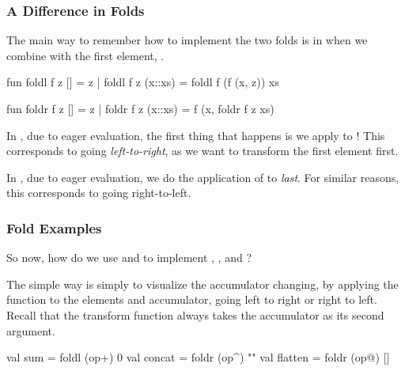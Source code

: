 \documentclass[aspectratio=169, handout]{beamer}
\begin{document}
\begin{frame}[fragile]
  \frametitle{A Difference in Folds}

  The main way to remember how to implement the two folds is in when we 
  combine with the first element, .

  \pause
  \vspace{\fill}

  \begin{codeblock}
    fun foldl f z [] = z
      | foldl f z (x::xs) = foldl f (f (x, z)) xs  

    fun foldr f z [] = z
      | foldr f z (x::xs) = f (x, foldr f z xs)
  \end{codeblock}

  \pause
  \vspace{\fill}

  In , due to eager evaluation, the first thing that happens is we
  apply  to ! This corresponds to going \textit{left-to-right},
  as we want to transform the first element first.

  \pause
  \vspace{\fill}

  In , due to eager evaluation, we do the application of 
  to  \textit{last}. For similar reasons, this corresponds to going
  right-to-left.
\end{frame}

\begin{frame}[fragile]
  \frametitle{Fold Examples}

  So now, how do we use  and  to implement
  , , and ?

  \pause
  \vspace{\fill}
  
  The simple way is simply to visualize the accumulator changing, by 
  applying the function to the elements and accumulator, going left to
  right or right to left. Recall that the transform function 
  always takes the accumulator as its second argument.

  \pause
  \vspace{\fill}

  \begin{codeblock}
    val sum = foldl (op+) 0 
    val concat = foldr (op^) ""
    val flatten = foldr (op@) [] 
  \end{codeblock}
\end{frame}
\end{document}
